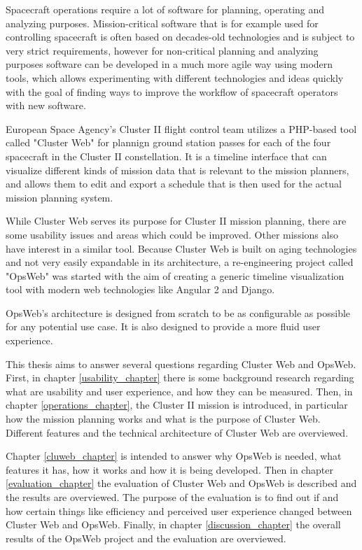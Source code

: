 Spacecraft operations require a lot of software for planning, operating and analyzing purposes. Mission-critical software that is for example used for controlling spacecraft is often based on decades-old technologies and is subject to very strict requirements, however for non-critical planning and analyzing purposes software can be developed in a much more agile way using modern tools, which allows experimenting with different technologies and ideas quickly with the goal of finding ways to improve the workflow of spacecraft operators with new software.

European Space Agency's Cluster II flight control team utilizes a PHP-based tool called "Cluster Web" for plannign ground station passes for each of the four spacecraft in the Cluster II constellation. It is a timeline interface that can visualize different kinds of mission data that is relevant to the mission planners, and allows them to edit and export a schedule that is then used for the actual mission planning system.

While Cluster Web serves its purpose for Cluster II mission planning, there are some usability issues and areas which could be improved. Other missions also have interest in a similar tool. Because Cluster Web is built on aging technologies and not very easily expandable in its architecture, a re-engineering project called "OpsWeb" was started with the aim of creating a generic timeline visualization tool with modern web technologies like Angular 2 and Django.

OpsWeb's architecture is designed from scratch to be as configurable as possible for any potential use case. It is also designed to provide a more fluid user experience.

This thesis aims to answer several questions regarding Cluster Web and OpsWeb. First, in chapter \ref{usability_chapter} there is some background research regarding what are usability and user experience, and how they can be measured. Then, in chapter \ref{operations_chapter}, the Cluster II mission is introduced, in particular how the mission planning works and what is the purpose of Cluster Web. Different features and the technical architecture of Cluster Web are overviewed.

Chapter \ref{cluweb_chapter} is intended to answer why OpsWeb is needed, what features it has, how it works and how it is being developed. Then in chapter \ref{evaluation_chapter} the evaluation of Cluster Web and OpsWeb is described and the results are overviewed. The purpose of the evaluation is to find out if and how certain things like efficiency and perceived user experience changed between Cluster Web and OpsWeb. Finally, in chapter \ref{discussion_chapter} the overall results of the OpsWeb project and the evaluation are overviewed.